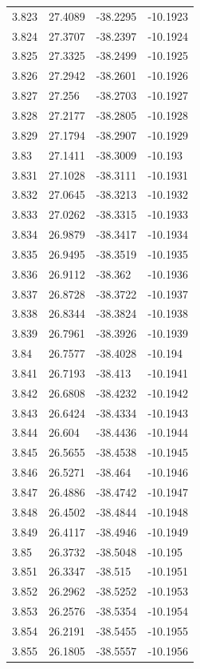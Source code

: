 \begin{tabular}{llll}
3.823 & 27.4089 & -38.2295 & -10.1923 \\
3.824 & 27.3707 & -38.2397 & -10.1924 \\
3.825 & 27.3325 & -38.2499 & -10.1925 \\
3.826 & 27.2942 & -38.2601 & -10.1926 \\
3.827 & 27.256 & -38.2703 & -10.1927 \\
3.828 & 27.2177 & -38.2805 & -10.1928 \\
3.829 & 27.1794 & -38.2907 & -10.1929 \\
3.83 & 27.1411 & -38.3009 & -10.193 \\
3.831 & 27.1028 & -38.3111 & -10.1931 \\
3.832 & 27.0645 & -38.3213 & -10.1932 \\
3.833 & 27.0262 & -38.3315 & -10.1933 \\
3.834 & 26.9879 & -38.3417 & -10.1934 \\
3.835 & 26.9495 & -38.3519 & -10.1935 \\
3.836 & 26.9112 & -38.362 & -10.1936 \\
3.837 & 26.8728 & -38.3722 & -10.1937 \\
3.838 & 26.8344 & -38.3824 & -10.1938 \\
3.839 & 26.7961 & -38.3926 & -10.1939 \\
3.84 & 26.7577 & -38.4028 & -10.194 \\
3.841 & 26.7193 & -38.413 & -10.1941 \\
3.842 & 26.6808 & -38.4232 & -10.1942 \\
3.843 & 26.6424 & -38.4334 & -10.1943 \\
3.844 & 26.604 & -38.4436 & -10.1944 \\
3.845 & 26.5655 & -38.4538 & -10.1945 \\
3.846 & 26.5271 & -38.464 & -10.1946 \\
3.847 & 26.4886 & -38.4742 & -10.1947 \\
3.848 & 26.4502 & -38.4844 & -10.1948 \\
3.849 & 26.4117 & -38.4946 & -10.1949 \\
3.85 & 26.3732 & -38.5048 & -10.195 \\
3.851 & 26.3347 & -38.515 & -10.1951 \\
3.852 & 26.2962 & -38.5252 & -10.1953 \\
3.853 & 26.2576 & -38.5354 & -10.1954 \\
3.854 & 26.2191 & -38.5455 & -10.1955 \\
3.855 & 26.1805 & -38.5557 & -10.1956 \\

\end{tabular}
